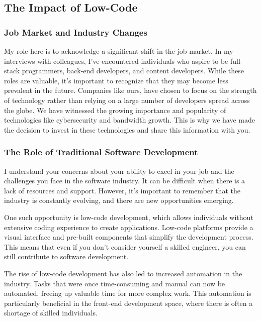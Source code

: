 \subsection{The Impact of Low-Code}\label{the-impact-of-low-code}

\subsubsection{Job Market and Industry
  Changes}\label{job-market-and-industry-changes}

My role here is to acknowledge a significant shift in the job market. In
my interviews with colleagues, I've encountered individuals who aspire
to be full-stack programmers, back-end developers, and content
developers. While these roles are valuable, it's important to recognize
that they may become less prevalent in the future. Companies like ours, have chosen to focus on the strength of technology rather
than relying on a large number of developers spread across the globe. We
have witnessed the growing importance and popularity of technologies
like cybersecurity and bandwidth growth. This is why we have made the
decision to invest in these technologies and share this information with
you.

\subsubsection{The Role of Traditional Software
  Development}\label{the-role-of-traditional-software-development}

I understand your concerns about your ability to excel in your job and
the challenges you face in the software industry. It can be difficult
when there is a lack of resources and support. However, it's important
to remember that the industry is constantly evolving, and there are new
opportunities emerging.

One such opportunity is low-code development, which allows individuals
without extensive coding experience to create applications. Low-code
platforms provide a visual interface and pre-built components that
simplify the development process. This means that even if you don't
consider yourself a skilled engineer, you can still contribute to
software development.

The rise of low-code development has also led to increased automation in
the industry. Tasks that were once time-consuming and manual can now be
automated, freeing up valuable time for more complex work. This
automation is particularly beneficial in the front-end development
space, where there is often a shortage of skilled individuals.

